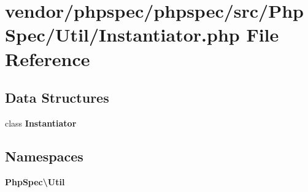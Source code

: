 \section{vendor/phpspec/phpspec/src/\+Php\+Spec/\+Util/\+Instantiator.php File Reference}
\label{phpspec_2phpspec_2src_2_php_spec_2_util_2_instantiator_8php}
\subsection*{Data Structures}
\begin{DoxyCompactItemize}
\item 
class {\bf Instantiator}
\end{DoxyCompactItemize}
\subsection*{Namespaces}
\begin{DoxyCompactItemize}
\item 
 {\bf Php\+Spec\textbackslash{}\+Util}
\end{DoxyCompactItemize}
